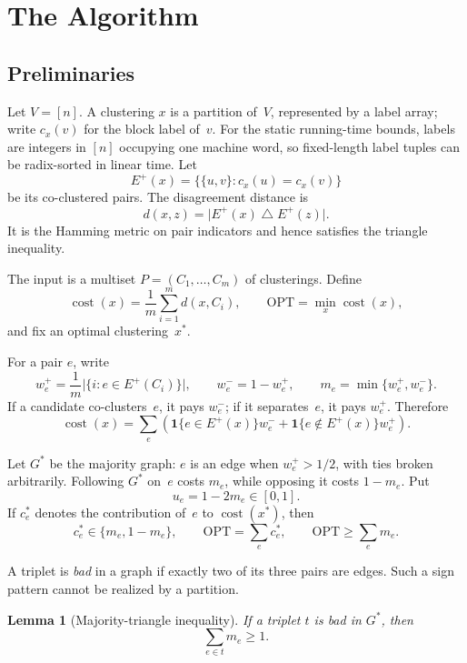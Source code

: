 \documentclass[11pt,letterpaper]{article}
\newtheorem{lemma}[theorem]{Lemma}
\theoremstyle{definition}
\theoremstyle{remark}
\newcommand{\OPT}{\mathrm{OPT}}
\newcommand{\cost}{\operatorname{cost}}
\newcommand{\1}{\mathbf{1}}
\begin{document}
\section{The Algorithm}
\label{sec:algorithm}

\subsection{Preliminaries}

Let $V=[n]$.  A clustering $x$ is a partition of~$V$, represented by a label array; write $c_x(v)$ for the block label of~$v$.  For the static running-time bounds, labels are integers in $[n]$ occupying one machine word, so fixed-length label tuples can be radix-sorted in linear time.  Let
\[
 E^+(x)=\bigl\{\{u,v\}:c_x(u)=c_x(v)\bigr\}
\]
be its co-clustered pairs.  The disagreement distance is
\[
 d(x,z)=\bigl|E^+(x)\mathbin\triangle E^+(z)\bigr|.
\]
It is the Hamming metric on pair indicators and hence satisfies the triangle inequality.

The input is a multiset $P=(C_1,\ldots,C_m)$ of clusterings.  Define
\[
 \cost(x)=\frac1m\sum_{i=1}^m d(x,C_i),
 \qquad
 \OPT=\min_x\cost(x),
\]
and fix an optimal clustering~$x^*$.

For a pair $e$, write
\[
 w_e^+=\frac1m\bigl|\{i:e\in E^+(C_i)\}\bigr|,
 \qquad
 w_e^-=1-w_e^+,
 \qquad
 m_e=\min\{w_e^+,w_e^-\}.
\]
If a candidate co-clusters~$e$, it pays $w_e^-$; if it separates~$e$, it pays $w_e^+$.  Therefore
\begin{equation}\label{eq:pair-cost}
 \cost(x)=\sum_e\left(\1\{e\in E^+(x)\}w_e^-+
                 \1\{e\notin E^+(x)\}w_e^+\right).
\end{equation}

Let $G^*$ be the majority graph: $e$ is an edge when $w_e^+>1/2$, with ties broken arbitrarily.  Following $G^*$ on~$e$ costs $m_e$, while opposing it costs $1-m_e$.  Put
\[
 u_e=1-2m_e\in[0,1].
\]
If $c_e^*$ denotes the contribution of~$e$ to $\cost(x^*)$, then
\begin{equation}\label{eq:opt-lb}
 c_e^*\in\{m_e,1-m_e\},
 \qquad
 \OPT=\sum_e c_e^*,
 \qquad
 \OPT\ge \sum_e m_e.
\end{equation}

A triplet is \emph{bad} in a graph if exactly two of its three pairs are edges.  Such a sign pattern cannot be realized by a partition.

\begin{lemma}[Majority-triangle inequality]\label{lem:majority-triangle}
If a triplet $t$ is bad in $G^*$, then
\[
 \sum_{e\in t}m_e\ge1.
\]
\end{lemma}
\end{document}
